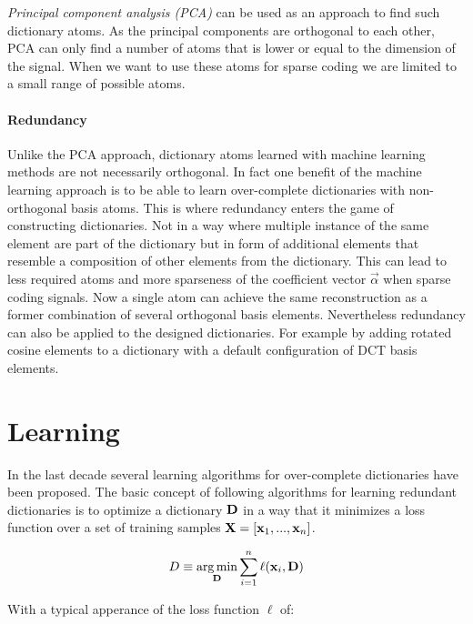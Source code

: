 \emph{Principal component analysis (PCA)} can be used as an approach to find
such dictionary atoms. As the principal components are orthogonal to each other,
PCA can only find a number of atoms that is lower or equal to the
dimension of the signal. When we want to use these atoms for sparse coding we
are limited to a small range of possible atoms.

\paragraph{Redundancy} Unlike the PCA approach,
dictionary atoms learned with machine learning methods are not necessarily
orthogonal. In fact one benefit of the machine learning approach is to be able
to learn over-complete dictionaries with non-orthogonal basis atoms. This is
where redundancy enters the game of constructing dictionaries. Not in a way
where multiple instance of the same element are part of the dictionary but in
form of additional elements that resemble a composition of other elements from
the dictionary. This can lead to less required atoms and more sparseness of the
coefficient vector $\vec{\alpha}$ when sparse coding signals. Now a single atom
can achieve the same reconstruction as a former combination of several
orthogonal basis elements. 
Nevertheless redundancy can also be applied to the designed
dictionaries. For example by adding rotated cosine elements to a dictionary with
a default configuration of DCT basis elements.


\section{Learning}
In the last decade several learning algorithms for over-complete dictionaries
have been proposed. 
The basic concept of following algorithms for learning
redundant dictionaries is to optimize a dictionary $\boldsymbol{\mathrm{D}}$ in a
way that it minimizes a loss function over a set of training samples
$\boldsymbol{\mathrm{X}}=[\boldsymbol{\mathrm{x}}_1,...,\boldsymbol{\mathrm{x}}_n]$.

\begin{align} 
D \equiv \operatorname*{arg\,min}_{\boldsymbol{\mathrm{D}}} \sum_{i=1}^n \ell(\boldsymbol{\mathrm{x}}_i,\boldsymbol{\mathrm{D}})
\end{align}

With a typical apperance of the loss function $\ell$ of:

